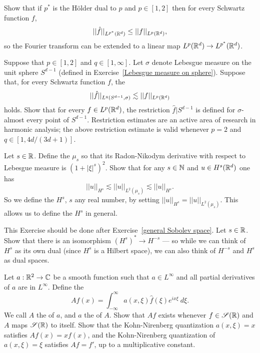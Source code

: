 \begin{exercise}
Show that if $p^*$ is the H\"older dual to $p$ and $p \in [1, 2]$ then for every Schwartz function $f$,
\[||\hat f||_{L^{p^*}(\mathbb{R}^d)} \leq ||f||_{L^p(\mathbb{R}^d)},\]
so the Fourier transform can be extended to a linear map $L^p(\mathbb{R}^d) \to L^{p^*}(\mathbb{R}^d)$.
\end{exercise}

\begin{exercise}
Suppose that $p \in [1, 2]$ and $q \in [1, \infty]$.
Let $\sigma$ denote Lebesgue measure on the unit sphere $S^{d-1}$ (defined in Exercise~\ref{Lebesgue measure on sphere}).
Suppose that, for every Schwartz function $f$, the 
\[||\hat f||_{L^q(S^{d-1}, \sigma)} \lesssim ||f||_{L^p(\mathbb{R}^d)}\]
holds.
Show that for every $f \in L^p(\mathbb{R}^d)$, the restriction $\hat f|S^{d-1}$ is defined for $\sigma$-almost every point of $S^{d-1}$.
Restriction estimates are an active area of research in harmonic analysis; the above restriction estimate is valid whenever $p = 2$ and $q \in [1, 4d/(3d+1)]$.
\end{exercise}

\begin{exercise}\label{general Sobolev space}
Let $s \in \mathbb{R}$. Define the  $\mu_s$ so that its Radon-Nikodym derivative with respect to Lebesgue measure is $(1 + |\xi|^s)^2$.
Show that for any $s \in \mathbb{N}$ and $u \in H^s(\mathbb{R}^d)$ one has
\[||u||_{H^s} \lesssim ||u||_{L^2(\mu_s)} \lesssim ||u||_{H^s}.\]
So we define the  $H^s$, $s$ any real number, by setting $||u||_{H^s} = ||u||_{L^2(\mu_s)}$.
This allows us to define the  $H^s$ in general.
\end{exercise}

\begin{exercise}
This Exercise should be done after Exercise~\ref{general Sobolev space}.
Let $s \in \mathbb{R}$. Show that there is an isomorphism $(H^s)^* \to H^{-s}$ --- so while we can think of $H^s$ as its own dual (since $H^s$ is a Hilbert space), we can also think of $H^{-s}$ and $H^s$ as dual spaces.
\end{exercise}

\begin{exercise}
Let $a: \mathbb{R}^2 \to \mathbb{C}$ be a smooth function such that $a \in L^\infty$ and all partial derivatives of $a$ are in $L^\infty$.
Define the 
\[Af(x) = \int_{-\infty}^{\infty} a(x, \xi) \hat f(\xi) e^{ix\xi}~d\xi.\]
We call $A$ the  of $a$, and $a$ the  of $A$.
Show that $Af$ exists whenever $f \in \mathscr{S}(\mathbb{R})$ and $A$ maps $\mathscr{S}(\mathbb{R})$ to itself.
Show that the Kohn-Nirenberg quantization $a(x, \xi) = x$ satisfies $Af(x) = xf(x)$, and the Kohn-Nirenberg quantization of $a(x, \xi) = \xi$ satisfies $Af = f'$, up to a multiplicative constant.
\end{exercise}

